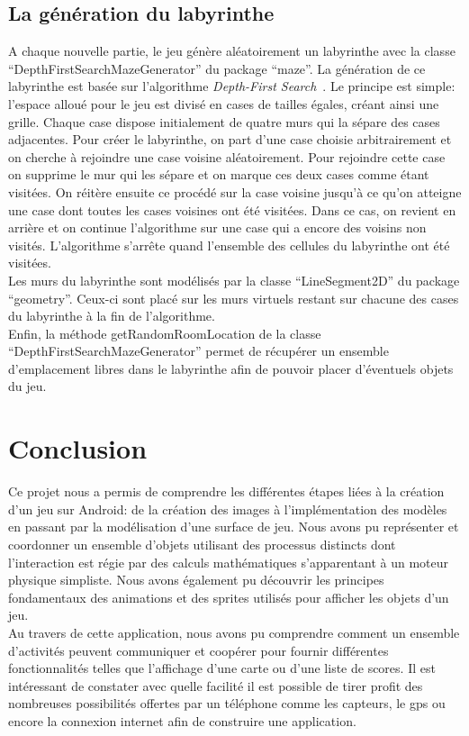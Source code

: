 \documentclass{article}
\begin{document}
\subsection{La génération du labyrinthe}
A chaque nouvelle partie, le jeu génère aléatoirement un labyrinthe avec la classe \enquote{DepthFirstSearchMazeGenerator} du package \enquote{maze}.
La génération de ce labyrinthe est basée sur l'algorithme \textit{Depth-First Search}~\cite{mazeDoc}.
Le principe est simple: l'espace alloué pour le jeu est divisé en cases de tailles égales, créant ainsi une grille.
Chaque case dispose initialement de quatre murs qui la sépare des cases adjacentes.
Pour créer le labyrinthe, on part d'une case choisie arbitrairement et on cherche à rejoindre une case voisine aléatoirement.
Pour rejoindre cette case on supprime le mur qui les sépare et on marque ces deux cases comme étant visitées.
On réitère ensuite ce procédé sur la case voisine jusqu'à ce qu'on atteigne une case dont toutes les cases voisines ont été visitées.
Dans ce cas, on revient en arrière et on continue l'algorithme sur une case qui a encore des voisins non visités.
L'algorithme s'arrête quand l'ensemble des cellules du labyrinthe ont été visitées.\\

Les murs du labyrinthe sont modélisés par la classe \enquote{LineSegment2D} du package \enquote{geometry}.
Ceux-ci sont placé sur les murs virtuels restant sur chacune des cases du labyrinthe à la fin de l'algorithme.\\

Enfin, la méthode getRandomRoomLocation de la classe \enquote{DepthFirstSearchMazeGenerator} permet de récupérer un ensemble d'emplacement libres dans le labyrinthe afin de pouvoir placer d'éventuels objets du jeu.

\section{Conclusion}
Ce projet nous a permis de comprendre les différentes étapes liées à la création d'un jeu sur Android: de la création des images à l'implémentation des modèles en passant par la modélisation d'une surface de jeu.
Nous avons pu représenter et coordonner un ensemble d'objets utilisant des processus distincts dont l'interaction est régie par des calculs mathématiques s'apparentant à un moteur physique simpliste.
Nous avons également pu découvrir les principes fondamentaux des animations et des sprites utilisés pour afficher les objets d'un jeu.\\

Au travers de cette application, nous avons pu comprendre comment un ensemble d'activités peuvent communiquer et coopérer pour fournir différentes fonctionnalités telles que l'affichage d'une carte ou d'une liste de scores.
Il est intéressant de constater avec quelle facilité il est possible de tirer profit des nombreuses possibilités offertes par un téléphone comme les capteurs, le gps ou encore la connexion internet afin de construire une application.



\end{document}
